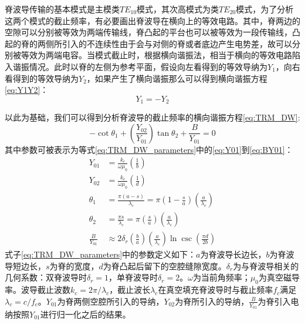 \documentclass[master]{thesis-uestc}
\begin{document}
脊波导传输的基本模式是主模类$TE_{10}$模式，其次高模式为类$TE_{20}$模式，为了分析这两个模式的截止频率，有必要画出脊波导在横向上的等效电路。其中，脊两边的空隙可以分别被等效为两端传输线，脊凸起的平台也可以被等效为一段传输线，凸起的脊的两侧所引入的不连续性由于会与对侧的脊或者底边产生电势差，故可以分别被等效为两端电容。当模式截止时，根据横向谐振法，相当于横向的等效电路陷入谐振情况。此时以脊的左侧为参考平面，假设向左看得到的等效导纳为$Y_{1}$，向右看得到的等效导纳为$Y_{2}$，如果产生了横向谐振那么可以得到横向谐振方程\ref{eq:Y1Y2}：
\begin{equation}\label{eq:Y1Y2}
    Y_{1}=-Y_{2}
\end{equation}

以此为基础，我们可以得到分析脊波导的截止频率的横向谐振方程\ref{eq:TRM_DW}:
\begin{equation}\label{eq:TRM_DW}
    -\cot \theta_1 + \left( \frac{Y_{02}}{Y_{01}} \right) \tan \theta_2 + \frac{B}{Y_{01}} = 0 
\end{equation}
其中参数可被表示为等式\ref{eq:TRM_DW_parameters}中的\ref{eq:Y01}到\ref{eq:BY01}：
\begin{subequations}\label{eq:TRM_DW_parameters}
    \begin{align}
    Y_{01} &= \frac{k_c}{\omega \mu_0} \left( \frac{1}{b} \right) \label{eq:Y01} \\
    Y_{02} &= \frac{k_c}{\omega \mu_0} \left( \frac{1}{d} \right) \label{eq:Y02} \\
    \theta_1 &= \frac{\pi (a - s)}{\lambda_c} = \pi \left( 1 - \frac{s}{a} \right) \left( \frac{a}{\lambda_c} \right) \label{eq:theta1} \\
    \theta_2 &= \frac{\pi s}{\lambda_c} = \pi \left( \frac{s}{a} \right) \left( \frac{a}{\lambda_c} \right) \label{eq:theta2} \\
    \frac{B}{Y_{01}} & \approx 2 \delta_{r} \left( \frac{b}{a} \right) \left( \frac{a}{\lambda_c} \right) \ln \csc \left( \frac{\pi d}{2b} \right) \label{eq:BY01}
    \end{align}
\end{subequations}
式子\ref{eq:TRM_DW_parameters}中的参数定义如下：$a$为脊波导长边长，$b$为脊波导短边长，$s$为脊的宽度，$d$为脊凸起后留下的空腔缝隙宽度。$\delta_{r}$为与脊波导相关的几何系数：双脊波导时$\delta_{r}=1$，单脊波导时$\delta_{r}=2$。$\omega$为当前角频率；$\mu_0$为真空磁导率。波导截止波数$k_c=2\pi / \lambda_c$，截止波长$\lambda_c$在真空填充脊波导时与截止频率$f_c$满足$\lambda_c=c/f_c$。$Y_{01}$为脊两侧空腔所引入的导纳，$Y_{02}$为脊所引入的导纳，$\frac{B}{Y_{01}}$为脊引入电纳按照$Y_{01}$进行归一化之后的结果。
\end{document}
